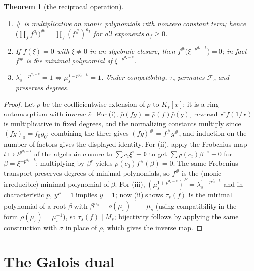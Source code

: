 \documentclass[10pt,journal,draftclsnofoot,onecolumn]{IEEEtran}
\newtheorem{theorem}{Theorem}[section]
\theoremstyle{definition}
\theoremstyle{remark}
\begin{document}
\begin{theorem}[the reciprocal operation]\label{thm:T2}
\begin{enumerate}
\item[(i)] \(\#\) is multiplicative on monic polynomials with nonzero
constant term; hence
\(\big(\prod_f f^{a_f}\big)^{\#} = \prod_f (f^{\#})^{a_f}\) for all
exponents \(a_f \ge 0\).
\item[(ii)] If \(f(\xi) = 0\) with \(\xi \ne 0\) in an algebraic
closure, then \(f^{\#}\big(\xi^{-p^{d_s-k}}\big) = 0\); in fact
\(f^{\#}\) is the minimal polynomial of \(\xi^{-p^{d_s-k}}\).
\item[(iii)] \(\lambda_s^{1+p^{d_s-k}} = 1 \iff
\mu_s^{1+p^{d_s-k}} = 1\). Under compatibility, \(\tau_s\) permutes
\(\mathcal{F}_s\) and preserves degrees.
\end{enumerate}
\end{theorem}

\begin{proof}
Let \(\bar\rho\) be the coefficientwise extension of \(\rho\) to
\(K_s[x]\); it is a ring automorphism with inverse \(\bar\sigma\).
For (i), \(\overline\rho(fg) = \bar\rho(f)\bar\rho(g)\), reversal
\(x^{r}f(1/x)\) is multiplicative in fixed degrees, and the normalizing
constants multiply since \((fg)_0 = f_0 g_0\); combining the three gives
\((fg)^{\#} = f^{\#} g^{\#}\), and induction on the number of factors
gives the displayed identity. For (ii), apply the Frobenius map
\(t \mapsto t^{p^{d_s-k}}\) of the algebraic closure to
\(\sum c_i \xi^i = 0\) to get \(\sum \rho(c_i) \beta^{-i} = 0\) for
\(\beta = \xi^{-p^{d_s-k}}\); multiplying by \(\beta^r\) yields
\(\rho(c_0) f^{\#}(\beta) = 0\). The same Frobenius transport preserves
degrees of minimal polynomials, so \(f^{\#}\) is the (monic irreducible)
minimal polynomial of \(\beta\). For (iii),
\((\mu_s^{1+p^{d_s-k}})^P = \lambda_s^{1+p^{d_s-k}}\) and in
characteristic \(p\), \(y^P = 1\) implies \(y = 1\); now (ii) shows
\(\tau_s(f)\) is the minimal polynomial of a root \(\beta\) with
\(\beta^{n_0} = \rho(\mu_s)^{-1} = \mu_s\) (using compatibility in the
form \(\rho(\mu_s) = \mu_s^{-1}\)), so \(\tau_s(f) \mid \bar M_s\);
bijectivity follows by applying the same construction with \(\sigma\) in
place of \(\rho\), which gives the inverse map.
\end{proof}

\section{The Galois dual}\label{sec:dual}
\end{document}
